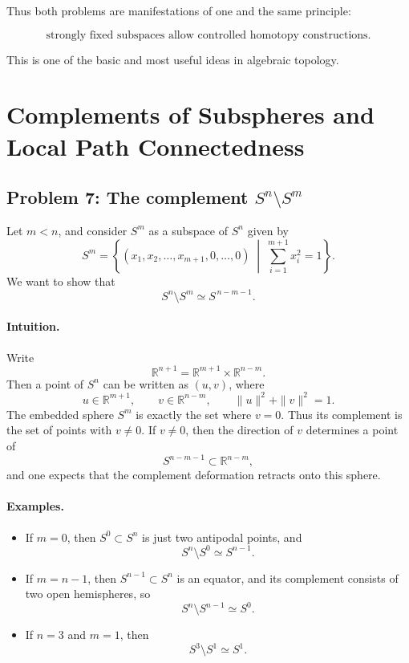 \documentclass[12pt,a4paper]{article}
\theoremstyle{notespace}
\begin{document}
Thus both problems are manifestations of one and the same principle:

\[
\text{strongly fixed subspaces allow controlled homotopy constructions.}
\]

This is one of the basic and most useful ideas in algebraic topology.


\section{Complements of Subspheres and Local Path Connectedness}

\subsection{Problem 7: The complement \(S^n\setminus S^m\)}

Let \(m<n\), and consider \(S^m\) as a subspace of \(S^n\) given by
\[
S^m
=
\left\{
(x_1,x_2,\dots,x_{m+1},0,\dots,0)
\;\middle|\;
\sum_{i=1}^{m+1} x_i^2 = 1
\right\}.
\]
We want to show that
\[
S^n \setminus S^m \simeq S^{\,n-m-1}.
\]

\paragraph{Intuition.}
Write
\[
\mathbb{R}^{n+1}=\mathbb{R}^{m+1}\times \mathbb{R}^{n-m}.
\]
Then a point of \(S^n\) can be written as \((u,v)\), where
\[
u\in \mathbb{R}^{m+1},
\qquad
v\in \mathbb{R}^{n-m},
\qquad
\|u\|^2+\|v\|^2=1.
\]
The embedded sphere \(S^m\) is exactly the set where \(v=0\). Thus its complement is the set of points with \(v\neq 0\). If \(v\neq 0\), then the direction of \(v\) determines a point of
\[
S^{n-m-1}\subset \mathbb{R}^{n-m},
\]
and one expects that the complement deformation retracts onto this sphere.

\paragraph{Examples.}
\begin{itemize}
	\item If \(m=0\), then \(S^0\subset S^n\) is just two antipodal points, and
	\[
	S^n\setminus S^0 \simeq S^{n-1}.
	\]
	
	\item If \(m=n-1\), then \(S^{n-1}\subset S^n\) is an equator, and its complement consists of two open hemispheres, so
	\[
	S^n\setminus S^{n-1}\simeq S^0.
	\]
	
	\item If \(n=3\) and \(m=1\), then
	\[
	S^3\setminus S^1 \simeq S^1.
	\]
\end{itemize}
\end{document}
